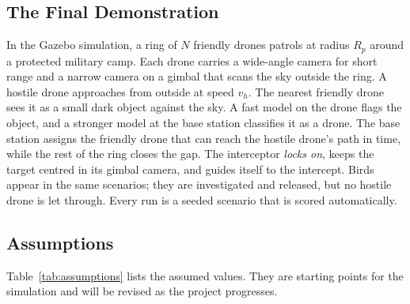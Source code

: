 \documentclass{article}
\begin{document}
\subsection{The Final Demonstration}

In the Gazebo simulation, a ring of $N$ friendly drones patrols at radius $R_p$
around a protected military camp. Each drone carries a wide-angle camera for
short range and a narrow camera on a gimbal that scans the sky outside the
ring. A hostile drone approaches from outside at speed $v_h$. The nearest
friendly drone sees it as a small dark object against the sky. A fast model on
the drone flags the object, and a stronger model at the base station
classifies it as a drone. The base station assigns the friendly drone that can
reach the hostile drone's path in time, while the rest of the ring closes the
gap. The interceptor \emph{locks on}, keeps the target centred in its gimbal
camera, and guides itself to the intercept. Birds appear in the same
scenarios; they are investigated and released, but no hostile drone is let
through. Every run is a seeded scenario that is scored automatically.

\subsection{Assumptions}
\label{sec:assumptions}

Table~\ref{tab:assumptions} lists the assumed values. They are starting
points for the simulation and will be revised as the project progresses.
\end{document}
